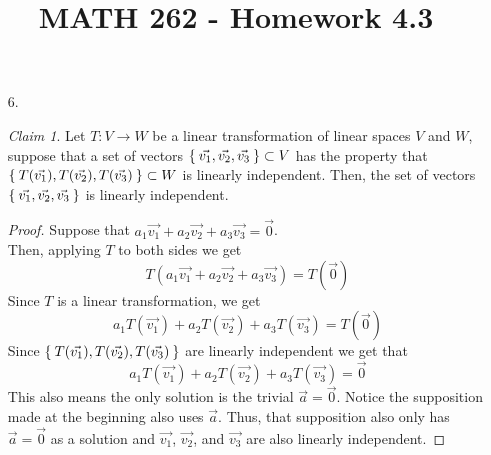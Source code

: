 \documentclass[letterpaper,12pt]{article}
\author{}
\title{MATH 262 - Homework 4.3}
\date{} %
\theoremstyle{remark}
\newtheorem*{claim}{Claim}
\begin{document}
\maketitle

\begin{enumerate}
  \item[6.]
    \begin{claim}
      Let $T: V \to W$ be a linear transformation of linear spaces $V$ and $W$, suppose that a set of vectors $\Set{\vec{v_1}, \vec{v_2}, \vec{v_3}} \subset V$ has the property that $\Set{T(\vec{v_1}), T(\vec{v_2}), T(\vec{v_3})} \subset W$ is linearly independent. Then, the set of vectors $\Set{\vec{v_1}, \vec{v_2}, \vec{v_3}}$ is linearly independent.
    \end{claim}
    \begin{proof}
      Suppose that $a_1\vec{v_1} + a_2\vec{v_2} + a_3\vec{v_3} = \vec{0}$. \\
      Then, applying $T$ to both sides we get
      \begin{equation*}
        T(a_1\vec{v_1} + a_2\vec{v_2} + a_3\vec{v_3}) = T(\vec{0})
      \end{equation*}
      Since $T$ is a linear transformation, we get
      \begin{equation*}
        a_1T(\vec{v_1}) + a_2T(\vec{v_2}) + a_3T(\vec{v_3}) = T(\vec{0})
      \end{equation*}
      Since $\Set{T(\vec{v_1}), T(\vec{v_2}), T(\vec{v_3})}$ are linearly independent we get that
      \begin{equation*}
        a_1T(\vec{v_1}) + a_2T(\vec{v_2}) + a_3T(\vec{v_3}) = \vec{0}
      \end{equation*}
      This also means the only solution is the trivial $\vec{a} = \vec{0}$. Notice the supposition made at the beginning also uses $\vec{a}$. Thus, that supposition also only has $\vec{a} = \vec{0}$ as a solution and $\vec{v_1}$, $\vec{v_2}$, and $\vec{v_3}$ are also linearly independent.
    \end{proof}
\end{enumerate}
\end{document}
